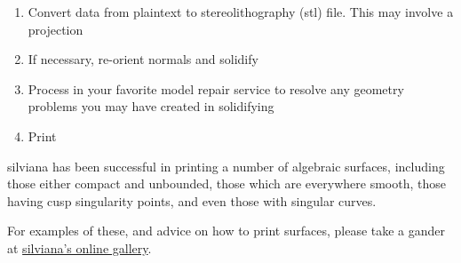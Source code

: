 \begin{enumerate}
\item Convert data from plaintext to stereolithography (\gls{stl}) file.  This may involve a projection
\item If necessary, re-orient normals and solidify
\item Process in your favorite model repair service to resolve any geometry problems you may have created in solidifying
\item Print
\end{enumerate}

silviana has been successful in printing a number of algebraic surfaces, including those either compact and unbounded, those which are everywhere
smooth, those having cusp singularity points, and even those with singular
curves.

For examples of these, and advice on how to print surfaces, please take a gander at \href{http://www.danibrake.org/gallery/}{silviana's online gallery}.
